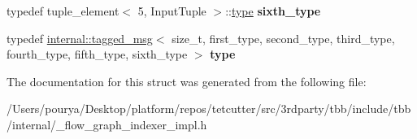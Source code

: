 \begin{DoxyCompactItemize}
\item 
\hypertarget{structinternal_1_1input__types_3_016_00_01InputTuple_01_4_a863645aa0f63c547a6f7731a9e9f3d21}{}typedef tuple\+\_\+element$<$ 5, Input\+Tuple $>$\+::\hyperlink{classinternal_1_1tagged__msg}{type} {\bfseries sixth\+\_\+type}\label{structinternal_1_1input__types_3_016_00_01InputTuple_01_4_a863645aa0f63c547a6f7731a9e9f3d21}

\item 
\hypertarget{structinternal_1_1input__types_3_016_00_01InputTuple_01_4_a1efe89b9400d04748efb0b315081d558}{}typedef \hyperlink{classinternal_1_1tagged__msg}{internal\+::tagged\+\_\+msg}$<$ size\+\_\+t, first\+\_\+type, second\+\_\+type, third\+\_\+type, fourth\+\_\+type, fifth\+\_\+type, sixth\+\_\+type $>$ {\bfseries type}\label{structinternal_1_1input__types_3_016_00_01InputTuple_01_4_a1efe89b9400d04748efb0b315081d558}

\end{DoxyCompactItemize}


The documentation for this struct was generated from the following file\+:\begin{DoxyCompactItemize}
\item 
/\+Users/pourya/\+Desktop/platform/repos/tetcutter/src/3rdparty/tbb/include/tbb/internal/\+\_\+flow\+\_\+graph\+\_\+indexer\+\_\+impl.\+h\end{DoxyCompactItemize}
